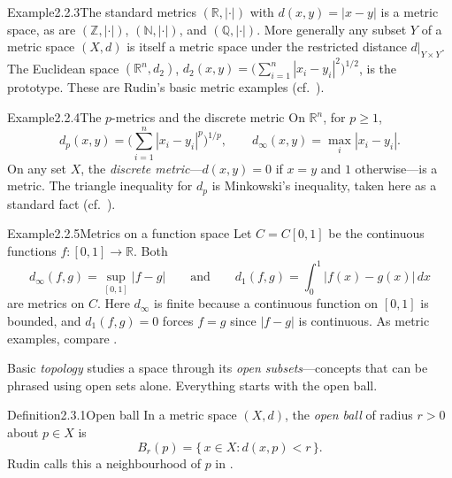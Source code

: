 \documentclass[main.tex]{subfiles}
\begin{document}
\begin{ObjL}{Example}{2.2.3}{The standard metrics}
$(\mathbb R,|\cdot|)$ with $d(x,y)=|x-y|$ is a metric space, as are $(\mathbb Z,|\cdot|)$,
$(\mathbb N,|\cdot|)$, and $(\mathbb Q,|\cdot|)$. More generally any subset $Y$ of a metric space
$(X,d)$ is itself a metric space under the restricted distance $d|_{Y\times Y}$. The Euclidean space
$(\mathbb R^n,d_2)$, $d_2(x,y)=\big(\sum_{i=1}^n|x_i-y_i|^2\big)^{1/2}$, is the prototype.
These are Rudin's basic metric examples (cf.\ ).
\end{ObjL}

\begin{ObjL}{Example}{2.2.4}{The $p$-metrics and the discrete metric}
On $\mathbb R^n$, for $p\ge1$,
\[ d_p(x,y)=\Big(\sum_{i=1}^n|x_i-y_i|^p\Big)^{1/p},\qquad d_\infty(x,y)=\max_i|x_i-y_i|. \]
On any set $X$, the \emph{discrete metric}---$d(x,y)=0$ if $x=y$ and $1$ otherwise---is a metric.
The triangle inequality for $d_p$ is Minkowski's inequality, taken here as a standard fact
(cf.\ ).
\end{ObjL}

\begin{ObjL}{Example}{2.2.5}{Metrics on a function space}
Let $C=C[0,1]$ be the continuous functions $f:[0,1]\to\mathbb R$. Both
\[ d_\infty(f,g)=\sup_{[0,1]}|f-g| \qquad\text{and}\qquad d_1(f,g)=\int_0^1|f(x)-g(x)|\,dx \]
are metrics on $C$. Here $d_\infty$ is finite because a continuous function on $[0,1]$ is bounded,
and $d_1(f,g)=0$ forces $f=g$ since $|f-g|$ is continuous. As metric examples, compare .
\end{ObjL}


\noindent Basic \emph{topology} studies a space through its \emph{open subsets}---concepts that can
be phrased using open sets alone. Everything starts with the open ball.

\begin{Obj}{Definition}{2.3.1}{Open ball}
In a metric space $(X,d)$, the \emph{open ball} of radius $r>0$ about $p\in X$ is
\[ B_r(p)=\{\,x\in X:d(x,p)<r\,\}. \]
Rudin calls this a neighbourhood of $p$ in .
\end{Obj}
\end{document}
